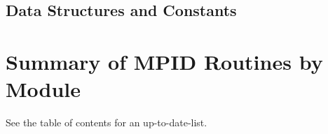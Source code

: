 \documentclass{article}
\begin{document}
\subsection{Data Structures and Constants}

%
%

\section{Summary of MPID Routines by Module}

See the table of contents for an up-to-date-list.




\end{document}
